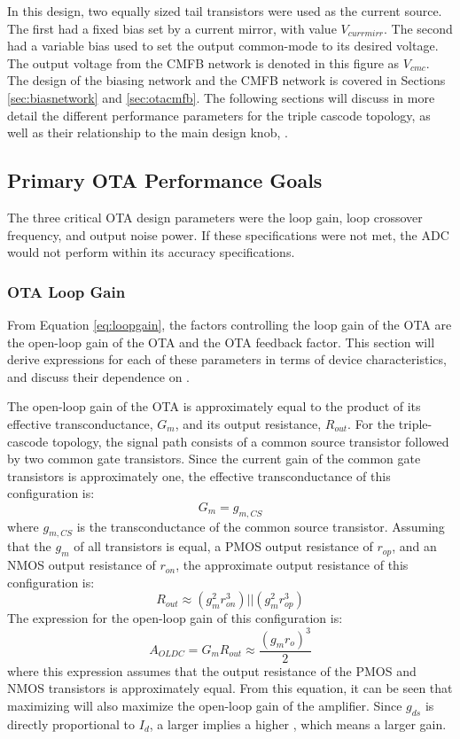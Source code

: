 In this design, two equally sized tail transistors were used as the current source. The first had a fixed bias set by a current mirror, with value $V_{currmirr}$. The second had a variable bias used to set the output common-mode to its desired voltage. The output voltage from the CMFB network is denoted in this figure as $V_{cmc}$. The design of the biasing network and the CMFB network is covered in Sections \ref{sec:biasnetwork} and \ref{sec:otacmfb}. The following sections will discuss in more detail the different performance parameters for the triple cascode topology, as well as their relationship to the main design knob, \gmid.
\subsection{Primary OTA Performance Goals}
The three critical OTA design parameters were the loop gain, loop crossover frequency, and output noise power. If these specifications were not met, the ADC would not perform within its accuracy specifications.
\subsubsection{OTA Loop Gain}
From Equation \ref{eq:loopgain}, the factors controlling the loop gain of the OTA are the open-loop gain of the OTA and the OTA feedback factor. This section will derive expressions for each of these parameters in terms of device characteristics, and discuss their dependence on \gmid. 

The open-loop gain of the OTA is approximately equal to the product of its effective transconductance, $G_{m}$, and its output resistance, $R_{out}$. For the triple-cascode topology, the signal path consists of a common source transistor followed by two common gate transistors. Since the current gain of the common gate transistors is approximately one, the effective transconductance of this configuration is:
\begin{equation}
\label{eq:gmeffective}
G_{m} = g_{m,CS}
\end{equation}
where $g_{m,CS}$ is the transconductance of the common source transistor. Assuming that the $g_{m}$ of all transistors is equal, a PMOS output resistance of $r_{op}$, and an NMOS output resistance of $r_{on}$, the approximate output resistance of this configuration is:
\begin{equation}
\label{eq:triplecascodero}
R_{out} \approx (g_{m}^{2}r_{on}^{3}) || (g_{m}^2r_{op}^{3})
\end{equation}
The expression for the open-loop gain of this configuration is:
\begin{equation}
\label{eq:triplecascodegain}
A_{OLDC} = G_{m}R_{out} \approx \dfrac{(g_{m}r_{o})^{3}}{2}
\end{equation}
where this expression assumes that the output resistance of the PMOS and NMOS transistors is approximately equal. From this equation, it can be seen that maximizing \gmgds\spc will also maximize the open-loop gain of the amplifier. Since $g_{ds}$ is directly proportional to $I_{d}$, a larger \gmid\spc implies a higher \gmgds, which means a larger gain.

